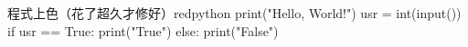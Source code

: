 \documentclass{article}
\begin{document}

\begin{mintbox}{程式上色（花了超久才修好）}{red}{python}
print("Hello, World!")
usr = int(input())
if usr == True:
    print("True")
else:
    print("False")
\end{mintbox}

\begin{large}

\end{large}
\end{document}

